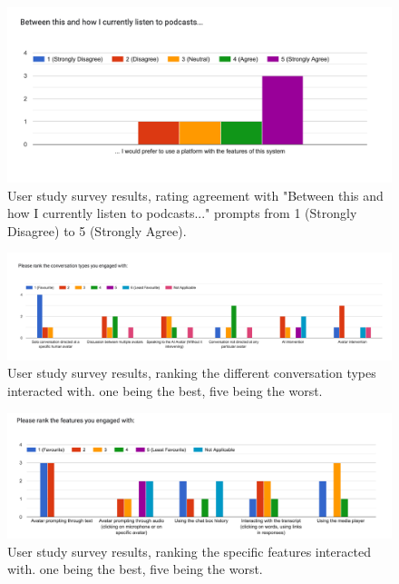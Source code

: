 \documentclass[12pt]{report}
\begin{document}
\begin{myfont}
        \begin{figure}[H]
        \centering
          \includegraphics[width=1\textwidth]{figures/user3.png}
          \caption{User study survey results, rating agreement with "Between this and how I currently listen to podcasts..." prompts from 1 (Strongly Disagree) to 5 (Strongly Agree).}
        \end{figure}

        \begin{figure}[H]
        \centering
          \includegraphics[width=1\textwidth]{figures/user4.png}
          \caption{User study survey results, ranking the different conversation types interacted with. one being the best, five being the worst.}
        \end{figure}

        \begin{figure}[H]
        \centering
          \includegraphics[width=1\textwidth]{figures/user5.png}
          \caption{User study survey results, ranking the specific features interacted with. one being the best, five being the worst.}
        \end{figure}
        

\end{myfont}
\end{document}
